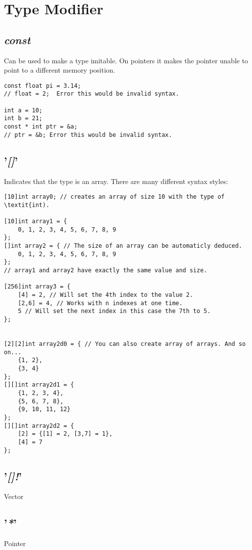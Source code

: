 \documentclass[10pt,a4paper]{article}
\begin{document}
\section{Type Modifier}


\subsection{\textit{const}}
Can be used to make a type imitable.
On pointers it makes the pointer unable to point to a different memory position.
\begin{lstlisting}
const float pi = 3.14;
// float = 2;  Error this would be invalid syntax.

int a = 10;
int b = 21;
const * int ptr = &a;
// ptr = &b; Error this would be invalid syntax.
\end{lstlisting}


\subsection{'\textit{[]}'}
Indicates that the type is an array.
There are many different syntax styles:
\begin{lstlisting}
[10]int array0; // creates an array of size 10 with the type of \textit{int).

[10]int array1 = {
	0, 1, 2, 3, 4, 5, 6, 7, 8, 9
};
[]int array2 = { // The size of an array can be automaticly deduced.
	0, 1, 2, 3, 4, 5, 6, 7, 8, 9
};
// array1 and array2 have exactly the same value and size.

[256]int array3 = {
	[4] = 2, // Will set the 4th index to the value 2.
	[2,6] = 4, // Works with n indexes at one time.
	5 // Will set the next index in this case the 7th to 5.
};


[2][2]int array2d0 = { // You can also create array of arrays. And so on...
	{1, 2},
	{3, 4}
};
[][]int array2d1 = {
	{1, 2, 3, 4},
	{5, 6, 7, 8},
	{9, 10, 11, 12}
};
[][]int array2d2 = {
	[2] = {[1] = 2, [3,7] = 1},
	[4] = 7
};

\end{lstlisting}


\subsection{'\textit{[]!}'}
Vector


\subsection{'\textit{*}'}
Pointer
\end{document}
